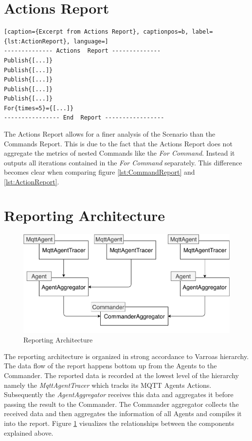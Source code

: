 \section{Actions Report}
\begin{lstlisting}[caption={Excerpt from Actions Report}, captionpos=b, label={lst:ActionReport}, language=]
-------------- Actions  Report --------------
Publish{[...]}
Publish{[...]}
Publish{[...]}
Publish{[...]}
Publish{[...]}
For{times=5}={[...]}
---------------- End  Report -----------------
\end{lstlisting}
The Actions Report allows for a finer analysis of the Scenario than the Commands Report.
This is due to the fact that the Actions Report does not aggregate the metrics of nested Commands like the \emph{For Command}.
Instead it outputs all iterations contained in the \emph{For Command} separately.
This difference becomes clear when comparing figure \ref{lst:CommandReport} and \ref{lst:ActionReport}.

\newpage
\section{Reporting Architecture}\label{sec:ReportingArchitecture}
\begin{figure}[H]
	\begin{center}
		\includegraphics[scale=0.75]{Resources/PDF/ReportingArchitecture}
		\caption{Reporting Architecture}
		\label{fig:ReportingArchitecture}
	\end{center}
\end{figure}
The reporting architecture is organized in strong accordance to Varroas hierarchy.
The data flow of the report happens bottom up from the Agents to the Commander.
The reported data is recorded at the lowest level of the hierarchy namely the \emph{MqttAgentTracer} which tracks its MQTT Agents Actions.
Subsequently the \emph{AgentAggregator} receives this data and aggregates it before passing the result to the Commander.
The Commander aggregator collects the received data and then aggregates the information of all Agents and compiles it into the report.
Figure \ref{fig:ReportingArchitecture} visualizes the relationships between the components explained above.

